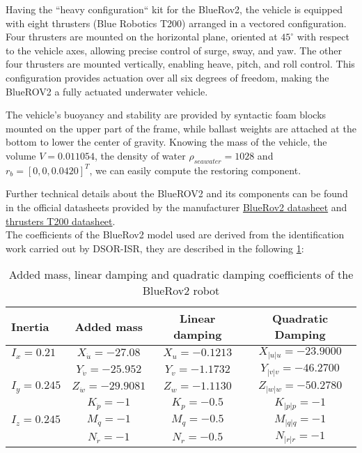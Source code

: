 Having the ``heavy configuration`` kit for the BlueRov2, the vehicle is equipped with eight thrusters (Blue Robotics T200) arranged in a vectored configuration. Four thrusters are mounted on the horizontal plane, 
oriented at $45^\circ$ with respect to the vehicle axes, allowing precise control of surge, sway, and yaw. The other four thrusters are mounted vertically, enabling 
heave, pitch, and roll control. This configuration provides actuation over all six degrees of freedom, making the BlueROV2 a fully actuated underwater vehicle.

The vehicle's buoyancy and stability are provided by syntactic foam blocks mounted on the upper part of the frame, while ballast weights are attached at the bottom to 
lower the center of gravity. Knowing the mass of the vehicle, the volume $V = 0.011054$, the density of water $\rho_{seawater} = 1028$ and $r_b = [0, 0, 0.0420]^T$, 
we can easily compute the restoring component.

Further technical details about the BlueROV2 and its components can be found in the official datasheets provided by the manufacturer \href{https://bluerobotics.com/wp-content/uploads/2017/03/br_bluerov2_datasheet_rev3-bleed-dragged.pdf}{BlueRov2 datasheet} 
and \href{https://cdn.robotshop.com/media/b/blu/rb-blu-27/pdf/rb-blu-27_-_documentation.pdf}{thrusters T200 datasheet}.\\
The coefficients of the BlueRov2 model used are derived from the identification work carried out by DSOR-ISR, they are described in the following \ref{tab:BlueRov_param}:

\begin{table}[H]
    \centering
    \begin{tabular}{l c c c} \toprule
        {Inertia} & {Added mass} & {Linear damping} & {Quadratic Damping} \\ \midrule
        $I_x = 0.21$ & $X_{\dot{u}} = -27.08$ & $X_u = -0.1213$  & $X_{|u|u} = -23.9000$ \\
        { } & $Y_{\dot{v}} = -25.952$ & $Y_v = -1.1732$  & $Y_{|v|v} = -46.2700$ \\
        $I_y = 0.245$ & $Z_{\dot{w}} = -29.9081$ & $Z_w = -1.1130$  & $Z_{|w|w} = -50.2780$ \\
        { } & $K_{\dot{p}} = -1$ & $K_p = -0.5$  & $K_{|p|p} = -1$ \\
        $I_z = 0.245$ & $M_{\dot{q}} = -1$ & $M_q = -0.5$  & $M_{|q|q} = -1$ \\
        { } & $N_{\dot{r}} = -1$ & $N_r = -0.5$  & $N_{|r|r} = -1$ \\ \bottomrule
    \end{tabular}
    \caption{Added mass, linear damping and quadratic damping coefficients of the BlueRov2 robot}
    \label{tab:BlueRov_param}
\end{table}

